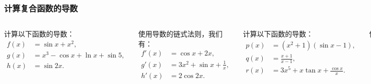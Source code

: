 \documentclass[
10pt,
aspectratio=43,
]{beamer}
\begin{document}
\begin{frame}
	\frametitle{计算复合函数的导数}
	\begin{columns}
		\centering
		计算以下函数的导数：
		\begin{align*}
			f(x) & = \sin x + x^2,                  \\
			g(x) & = x^3 - \cos x + \ln x + \sin 5, \\
			h(x) & = \sin 2x.
		\end{align*}

		\pause
		使用导数的链式法则，我们有：
		\begin{align*}
			f'(x) & = \cos x + 2x,                 \\
			g'(x) & = 3x^2 + \sin x + \frac{1}{x}, \\
			h'(x) & = 2\cos 2x.
		\end{align*}

		\centering
		计算以下函数的导数：
		\begin{align*}
			p(x) & = (x^2 + 1)(\sin x - 1),             \\
			q(x) & = \frac{x+1}{x-1},                   \\
			r(x) & = 3x^5 + x\tan x + \frac{\cos x}{x}.
		\end{align*}

		\pause
		使用导数的乘积法则和商法则，我们有：
		\begin{align*}
			p'(x) & = (2x)(\sin x - 1) + (x^2 + 1)(\cos x),           \\
			q'(x) & = -\frac{2}{(x-1)^2},                             \\
			r'(x) & = 15x^4 + \tan x + x\sec^2 x - \frac{\sin x}{x^2} \\
			      & \,\,\,\,\,\,\,-\frac{\cos (x)}{x^2}.
		\end{align*}
	\end{columns}
\end{frame}
\end{document}
